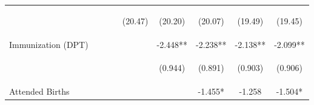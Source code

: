 \begin{landscape}
\begin{table}[htpb!]
\begin{center}
\begin{tabular}{lcccccccc}
	& \begin{footnotesize}		\end{footnotesize} & \begin{footnotesize}		\end{footnotesize} & \begin{footnotesize}		\end{footnotesize} & \begin{footnotesize}	(20.47)	\end{footnotesize} & \begin{footnotesize}	(20.20)	\end{footnotesize} & \begin{footnotesize}	(20.07)	\end{footnotesize} & \begin{footnotesize}	(19.49)	\end{footnotesize} & \begin{footnotesize}	(19.45)	\end{footnotesize} \\	
Immunization (DPT)	&		&		&		&		&	-2.448**	&	-2.238**	&	-2.138**	&	-2.099**	\\	
	& \begin{footnotesize}		\end{footnotesize} & \begin{footnotesize}		\end{footnotesize} & \begin{footnotesize}		\end{footnotesize} & \begin{footnotesize}		\end{footnotesize} & \begin{footnotesize}	(0.944)	\end{footnotesize} & \begin{footnotesize}	(0.891)	\end{footnotesize} & \begin{footnotesize}	(0.903)	\end{footnotesize} & \begin{footnotesize}	(0.906)	\end{footnotesize} \\	
Attended Births	&		&		&		&		&		&	-1.455*	&	-1.258	&	-1.504*	\\	

\end{tabular}
\end{center}
\end{table}
\end{landscape}
